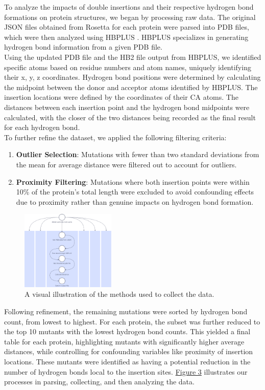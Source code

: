 \documentclass[sigconf, screen, authorversion, authoraddress=false, oneside]{acmart}
\begin{document}
To analyze the impacts of double insertions and their respective hydrogen bond formations on protein structures, we began by processing raw data. The original JSON files obtained from Rosetta for each protein were parsed into PDB files, which were then analyzed using HBPLUS \cite{HBPLUS_tool}. HBPLUS specializes in generating hydrogen bond information from a given PDB file.
\\
Using the updated PDB file and the HB2 file output from HBPLUS, we identified specific atoms based on residue numbers and atom names, uniquely identifying their x, y, z coordinates. Hydrogen bond positions were determined by calculating the midpoint between the donor and acceptor atoms identified by HBPLUS. The insertion locations were defined by the coordinates of their CA atoms. The distances between each insertion point and the hydrogen bond midpoints were calculated, with the closer of the two distances being recorded as the final result for each hydrogen bond.
\\
To further refine the dataset, we applied the following filtering criteria:
\begin{enumerate}
    \item \textbf{Outlier Selection}: Mutations with fewer than two standard deviations from the mean for average distance were filtered out to account for outliers.
    \item \textbf{Proximity Filtering}: Mutations where both insertion points were within 10\% of the protein's total length were excluded to avoid confounding effects due to proximity rather than genuine impacts on hydrogen bond formation.
\end{enumerate}

\begin{figure}
    \centering
    \includegraphics[width=0.4\textwidth]{double_ins_method.png}
    \caption{A visual illustration of the methods used to collect the data.}
    \label{fig:Figure3}
\end{figure}
Following refinement, the remaining mutations were sorted by hydrogen bond count, from lowest to highest. For each protein, the subset was further reduced to the top 10 mutants with the lowest hydrogen bond counts. This yielded a final table for each protein, highlighting mutants with significantly higher average distances, while controlling for confounding variables like proximity of insertion locations. These mutants were identified as having a potential reduction in the number of hydrogen bonds local to the insertion sites. \hyperref[fig:Figure3]{Figure 3} illustrates our processes in parsing, collecting, and then analyzing the data.
\end{document}

